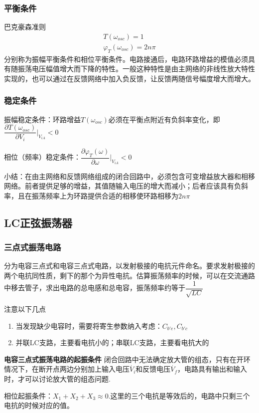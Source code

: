\documentclass{ctexart}
\newcommand*{\noindbfquad}[1]{{\noindent \bf{#1} \qquad}}
\begin{document}
\subsubsection{平衡条件}
巴克豪森准则
\begin{align}
    T(\omega_{osc})=1\\
    \varphi_T(\omega_{osc})=2n\pi
\end{align}
分别称为振幅平衡条件和相位平衡条件。电路接通后，电路环路增益的模值必须具有随振荡电压幅值增大而下降的特性。一般这种特性是由主网络的非线性放大特性实现的，也可以通过在反馈网络中加入负反馈，让反馈两随信号幅度增大而增大。
\subsubsection{稳定条件}
振幅稳定条件：环路增益$T(\omega_{osc})$必须在平衡点附近有负斜率变化，即$\dfrac{\partial T(\omega_{osc})}{\partial V_i}|_{V_{iA}}<0$

相位（频率）稳定条件：$\dfrac{\partial \varphi_T(\omega)}{\partial \omega}|_{V_{iA}}<0$

小结：在由主网络和反馈网络组成的闭合回路中，必须包含可变增益放大器和相移网络。前者提供足够的增益，其值随输入电压的增大而减小；后者应该具有负斜率，且在振荡频率上为环路提供合适的相移使环路相移为$2n\pi$
\subsection{LC正弦振荡器}
\subsubsection{三点式振荡电路}
分为电容三点式和电容三点式电路，以发射极接的电抗元件命名。要求发射极接的两个电抗同性质，剩下的那个为异性电抗。估算振荡频率的时候，可以在交流通路中移去管子，求出电路的总电感和总电容，振荡频率约等于$\dfrac{1}{\sqrt{LC}}$

注意以下几点
\begin{enumerate}
    \item 当发现缺少电容时，需要将寄生参数纳入考虑：$C_{b'e},C_{b'c}$
    \item 并联LC支路，主要看电抗小的；串联LC支路，主要看电抗大的
\end{enumerate}
\noindbfquad{电容三点式振荡电路的起振条件}
闭合回路中无法确定放大管的组态，只有在开环情况下，在断开点两边分别加上输入电压$\dot{V_i}$和反馈电压$\dot{V_f}$，电路具有输出和输入时，才可以讨论放大管的组态问题.

相位起振条件：$X_1+X_2+X_3\approx 0$.这里的三个电抗是等效后的，电路中只剩三个电抗的时候对应的值。
\end{document}
